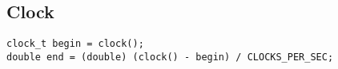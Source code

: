 \subsection{Clock}
\begin{lstlisting}
clock_t begin = clock();
double end = (double) (clock() - begin) / CLOCKS_PER_SEC;
\end{lstlisting}